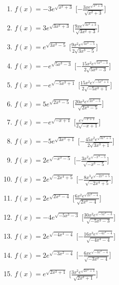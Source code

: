 \begin{enumerate}
\begin{multicols}{2}
\begin{enumerate}
\item \(f(x) = - 3 e^{\sqrt{x^{2} + 3}}\) \hfill [\(- \frac{3 x e^{\sqrt{x^{2} + 
3}}}{\sqrt{x^{2} + 3}}\)]
\item \(f(x) = 3 e^{\sqrt{3 x^{2} + 3}}\) \hfill [\(\frac{9 x e^{\sqrt{3 x^{2} + 
3}}}{\sqrt{3 x^{2} + 3}}\)]
\item \(f(x) = e^{\sqrt{3 x^{3} - 5}}\) \hfill [\(\frac{9 x^{2} e^{\sqrt{3 x^{3} 
- 5}}}{2 \sqrt{3 x^{3} - 5}}\)]
\item \(f(x) = - e^{\sqrt{5 x^{3} - 3}}\) \hfill [\(- \frac{15 x^{2} e^{\sqrt{5 
x^{3} - 3}}}{2 \sqrt{5 x^{3} - 3}}\)]
\item \(f(x) = - e^{\sqrt{- 5 x^{3} + 1}}\) \hfill [\(\frac{15 x^{2} e^{\sqrt{- 
5 x^{3} + 1}}}{2 \sqrt{- 5 x^{3} + 1}}\)]
\item \(f(x) = 5 e^{\sqrt{2 x^{4} - 5}}\) \hfill [\(\frac{20 x^{3} e^{\sqrt{2 
x^{4} - 5}}}{\sqrt{2 x^{4} - 5}}\)]
\item \(f(x) = - e^{\sqrt{- x + 1}}\) \hfill [\(\frac{e^{\sqrt{- x + 1}}}{2 
\sqrt{- x + 1}}\)]
\item \(f(x) = - 5 e^{\sqrt{3 x^{3} + 1}}\) \hfill [\(- \frac{45 x^{2} 
e^{\sqrt{3 x^{3} + 1}}}{2 \sqrt{3 x^{3} + 1}}\)]
\item \(f(x) = 2 e^{\sqrt{- x^{3} - 5}}\) \hfill [\(- \frac{3 x^{2} e^{\sqrt{- 
x^{3} - 5}}}{\sqrt{- x^{3} - 5}}\)]
\item \(f(x) = 2 e^{\sqrt{- 2 x^{4} + 5}}\) \hfill [\(- \frac{8 x^{3} e^{\sqrt{- 
2 x^{4} + 5}}}{\sqrt{- 2 x^{4} + 5}}\)]
\item \(f(x) = 2 e^{\sqrt{2 x^{3} - 4}}\) \hfill [\(\frac{6 x^{2} e^{\sqrt{2 
x^{3} - 4}}}{\sqrt{2 x^{3} - 4}}\)]
\item \(f(x) = - 4 e^{\sqrt{- 5 x^{3} - 3}}\) \hfill [\(\frac{30 x^{2} 
e^{\sqrt{- 5 x^{3} - 3}}}{\sqrt{- 5 x^{3} - 3}}\)]
\item \(f(x) = 2 e^{\sqrt{- 4 x^{4} - 4}}\) \hfill [\(- \frac{16 x^{3} 
e^{\sqrt{- 4 x^{4} - 4}}}{\sqrt{- 4 x^{4} - 4}}\)]
\item \(f(x) = 2 e^{\sqrt{- 3 x^{2} - 4}}\) \hfill [\(- \frac{6 x e^{\sqrt{- 3 
x^{2} - 4}}}{\sqrt{- 3 x^{2} - 4}}\)]
\item \(f(x) = e^{\sqrt{2 x^{3} + 1}}\) \hfill [\(\frac{3 x^{2} e^{\sqrt{2 x^{3} 
+ 1}}}{\sqrt{2 x^{3} + 1}}\)]
\end{enumerate}
\end{multicols}


\end{enumerate}
